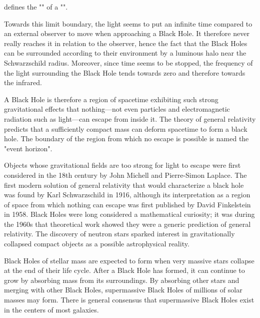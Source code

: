 	defines the "" of a "".
	
	Towards this limit boundary, the light seems to put an infinite time compared to an external observer to move when approaching a Black Hole. It therefore never really reaches it in relation to the observer, hence the fact that the Black Holes can be surrounded according to their environment by a luminous halo near the Schwarzschild radius. Moreover, since time seems to be stopped, the frequency of the light surrounding the Black Hole tends towards zero and therefore towards the infrared.

	A Black Hole is therefore a region of spacetime exhibiting such strong gravitational effects that nothing—not even particles and electromagnetic radiation such as light—can escape from inside it. The theory of general relativity predicts that a sufficiently compact mass can deform spacetime to form a black hole. The boundary of the region from which no escape is possible is named the "event horizon". 

	Objects whose gravitational fields are too strong for light to escape were first considered in the 18th century by John Michell and Pierre-Simon Laplace. The first modern solution of general relativity that would characterize a black hole was found by Karl Schwarzschild in 1916, although its interpretation as a region of space from which nothing can escape was first published by David Finkelstein in 1958. Black Holes were long considered a mathematical curiosity; it was during the 1960s that theoretical work showed they were a generic prediction of general relativity. The discovery of neutron stars sparked interest in gravitationally collapsed compact objects as a possible astrophysical reality.

	Black Holes of stellar mass are expected to form when very massive stars collapse at the end of their life cycle. After a Black Hole has formed, it can continue to grow by absorbing mass from its surroundings. By absorbing other stars and merging with other Black Holes, supermassive Black Holes of millions of solar masses may form. There is general consensus that supermassive Black Holes exist in the centers of most galaxies.

